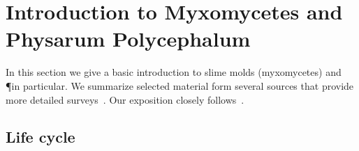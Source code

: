 \section{Introduction to Myxomycetes and Physarum Polycephalum}

In this section we give a basic introduction to slime molds (myxomycetes) and \P in particular. We summarize selected material form several sources that provide more detailed surveys~\cite{nowotny2000myxomyceten,grube2016physarum,Sauer1986,Mayne2016,howard1931life}. Our exposition closely follows~\cite{nowotny2000myxomyceten}.

\subsection{Life cycle}